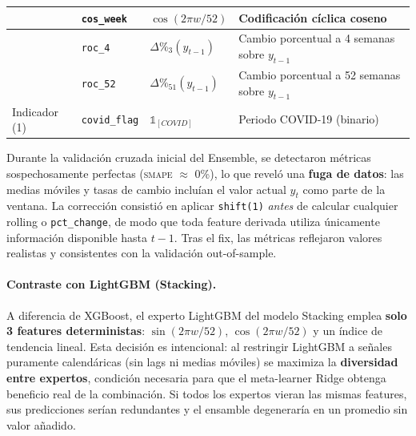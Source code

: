 \documentclass[12pt, letterpaper]{article}
\newcommand{\smape}{\textnormal{\textsc{smape}}}
\begin{document}
\begin{table}[H]
\begin{tabularx}{\textwidth}{l l l X}
  & \texttt{cos\_week}     & $\cos(2\pi w/52)$ & Codificaci\'on c\'iclica coseno \\
\midrule
{}
  & \texttt{roc\_4}  & $\Delta\%_{3}(y_{t-1})$ & Cambio porcentual a 4 semanas sobre $y_{t-1}$ \\
  & \texttt{roc\_52} & $\Delta\%_{51}(y_{t-1})$ & Cambio porcentual a 52 semanas sobre $y_{t-1}$ \\
\midrule
Indicador (1) & \texttt{covid\_flag} & $\mathbb{1}_{[COVID]}$ & Periodo COVID-19 (binario) \\
\bottomrule
\end{tabularx}
\end{table}

\begin{insightbox}
Durante la validaci\'on cruzada inicial del Ensemble, se detectaron m\'etricas sospechosamente perfectas (\smape{} $\approx$ 0\%), lo que revel\'o una \textbf{fuga de datos}: las medias m\'oviles y tasas de cambio inclu\'ian el valor actual $y_t$ como parte de la ventana. La correcci\'on consisti\'o en aplicar \texttt{shift(1)} \emph{antes} de calcular cualquier rolling o \texttt{pct\_change}, de modo que toda feature derivada utiliza \'unicamente informaci\'on disponible hasta $t-1$. Tras el fix, las m\'etricas reflejaron valores realistas y consistentes con la validaci\'on out-of-sample.
\end{insightbox}

\paragraph{Contraste con LightGBM (Stacking).}
A diferencia de XGBoost, el experto LightGBM del modelo Stacking emplea \textbf{solo 3 features deterministas}: $\sin(2\pi w/52)$, $\cos(2\pi w/52)$ y un \'indice de tendencia lineal. Esta decisi\'on es intencional: al restringir LightGBM a se\~nales puramente calend\'aricas (sin lags ni medias m\'oviles) se maximiza la \textbf{diversidad entre expertos}, condici\'on necesaria para que el meta-learner Ridge obtenga beneficio real de la combinaci\'on. Si todos los expertos vieran las mismas features, sus predicciones ser\'ian redundantes y el ensamble degenerar\'ia en un promedio sin valor a\~nadido.

\newpage
\end{document}
